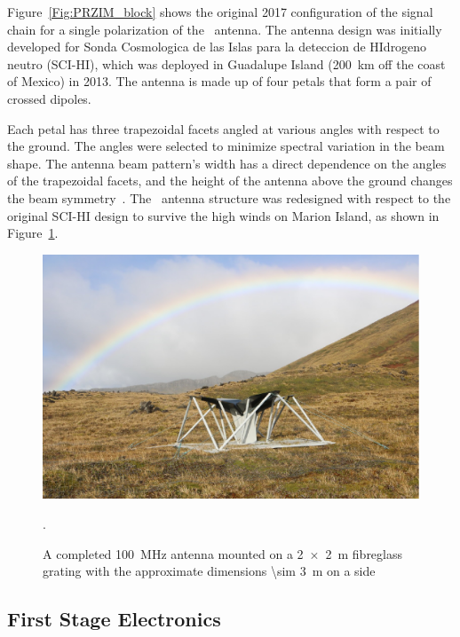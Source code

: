 Figure~\ref{Fig:PRZIM_block} shows the original 2017 configuration of the signal chain for a single polarization of the \prizm\ antenna. The antenna design was initially developed for Sonda Cosmologica de las Islas para la deteccion de HIdrogeno neutro (SCI-HI), which was deployed in Guadalupe Island (\SI{200}{\kilo \meter} off the coast of Mexico) in 2013. The antenna is made up of four petals that form a pair of crossed dipoles. 

Each petal has three trapezoidal facets angled at various angles with respect to the ground. The angles were selected to minimize spectral variation in the beam shape. The antenna beam pattern's width has a direct dependence on the angles of the trapezoidal facets, and the height of the antenna above the ground changes the beam symmetry~\citep{2014ApJ...782L...9V}.  The \prizm\ antenna structure was redesigned with respect to the original SCI-HI design to survive the high winds on Marion Island, as shown in Figure~\ref{Fig:tel}.  


\begin{figure}
	\centering
	\includegraphics[width=\linewidth]{Figures/tel}
	\caption{A completed \SI{100}{\mega \hertz} antenna mounted on a \SI{2x2}{\meter} fibreglass grating with the approximate dimensions \SI{\sim 3}{\meter} on a side}.
	\label{Fig:tel}
\end{figure}

\subsection{First Stage Electronics}

